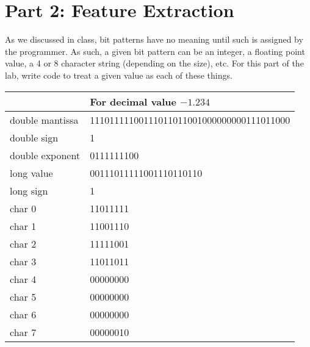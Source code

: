 \documentclass[letterpaper,12pt,titlepage]{article}
\begin{document}


\newpage
\section*{Part 2: Feature Extraction}
As we discussed in class, bit patterns have no meaning until such is assigned by the programmer. As such, a given bit pattern can be an integer, a floating point value, a 4 or 8 character string (depending on the size), etc. For this part of the lab, write code to treat a given value as each of these things.

\begin{center}
\begin{tabular} {| l | l | }
\hline
\multicolumn{2}{|c|}{\textbf{For decimal value $-1.234$}} \\
\hline
double mantissa & 11101111100111011011001000000000111011000 \\
double sign & 1 \\
double exponent & 0111111100\\
long value & 00111011111001110110110\\
long sign & 1\\
char 0 & 11011111\\
char 1 & 11001110\\
char 2 & 11111001\\
char 3 & 11011011\\
char 4 & 00000000\\
char 5 & 00000000\\
char 6 & 00000000\\
char 7 & 00000010\\ \hline
\end{tabular}
\end{center}


\end{document}
